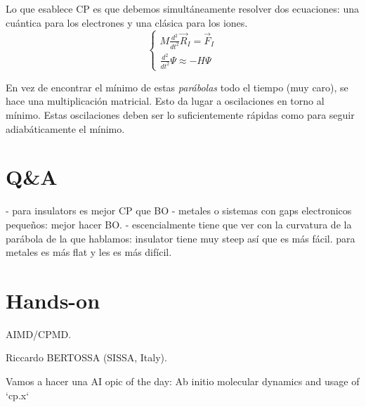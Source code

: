   Lo que esablece CP es que debemos simultáneamente resolver dos ecuaciones: una cuántica para los electrones y una clásica para los iones.
    $$\begin{cases}
      M \frac{d^2}{dt^2} \vec{R}_I =\vec{F}_I \\
      \frac{d^2}{dt^2} \Psi \approx -H \Psi
    \end{cases}$$

  En vez de encontrar el mínimo de estas \emph{parábolas} todo el tiempo (muy caro), se hace una multiplicación matricial. Esto da lugar a oscilaciones en torno al mínimo. Estas oscilaciones deben ser lo suficientemente rápidas como para seguir adiabáticamente el mínimo.

\section{Q\&A}


  - para insulators es mejor CP que BO
  - metales o sistemas con gaps electronicos pequeños: mejor hacer BO.
  - escencialmente tiene que ver con la curvatura de la parábola de la que hablamos: insulator tiene muy steep así que es más fácil. para metales es más flat y les es más difícil.

\section{Hands-on}

   AIMD/CPMD.

   Riccardo BERTOSSA (SISSA, Italy).

  Vamos a hacer una AI
  opic of the day: Ab initio molecular dynamics and usage of `cp.x`
